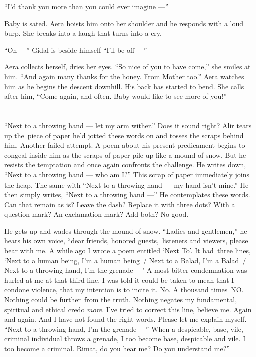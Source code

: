\documentclass[twoside,11pt,openany]{book}
\begin{document}
``I'd thank you more than you could ever imagine ---''

Baby is sated. Aera hoists him onto her shoulder and he responds with a loud burp. She breaks into a laugh that turns
into a cry.

``Oh ---'' Gidal is beside himself ``I'll be off ---''

Aera collects herself, dries her eyes. ``So nice of you to have come,'' she smiles at him.
``And again many thanks for the honey. From Mother too.'' Aera watches him as he begins the
descent downhill.  His back has started to bend. She calls after him, ``Come again, and often. Baby would
like to see more of you!''


\chapter{}

``Next to a throwing hand --- let my arm wither.'' Does it sound right? Alir tears up the~piece of paper he'd
jotted these words on{ }and tosses the scraps behind him. Another failed
attempt.  A poem about his present predicament begins to congeal inside him as the scraps of paper pile up like a mound
of snow. But he resists the temptation and once again confronts the challenge. He writes down, ``Next to a
throwing hand --- who am I?'' This scrap of paper immediately joins the heap. The same with
``Next to a throwing hand --- my hand isn't mine.'' He then
simply{ }writes, ``Next to a throwing hand ---'' He
contemplates these words. Can that remain as is? Leave the dash?  Replace it with three dots? With a question mark?
An exclamation mark? Add both? No good.

He gets up and wades through the mound of snow. ``Ladies and gentlemen,'' he hears his own
voice, ``dear friends, honored guests,~listeners and viewers, please bear with me. A while ago I wrote a
poem entitled `Next To'. It had~three lines, `Next to a human being, I'm a
human being~/ Next to a Balad, I'm a Balad~/ Next to a throwing hand, I'm the grenade ---' A most bitter
condemnation was hurled at me at that  third line. I was told it could be taken to mean that I condone violence, that
my intention is to incite it. No. A thousand times~NO.  Nothing could be further~from the truth. Nothing negates my
fundamental, spiritual and ethical credo \textit{more}. I've tried to correct this line, believe me. Again and again.
And I have not found the right words. Please let me explain myself. ``Next to a throwing hand, I'm the
grenade ---'' When a despicable, base, vile, criminal individual throws a grenade, I too become base,
despicable{ }and vile. I too become a criminal. Rimat, do you hear me? Do you
understand me?''
\end{document}
